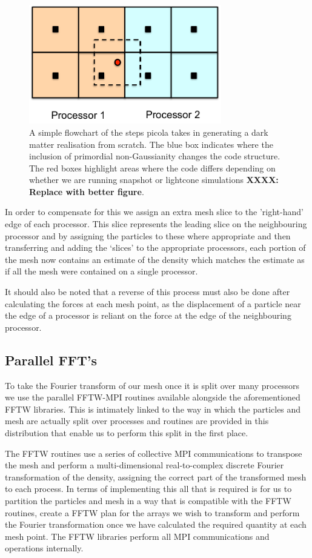 \documentclass[5p,authoryear]{elsarticle}
\begin{document}
\begin{figure}
\centering
\includegraphics[width=84mm]{cloudincell.pdf}
  \caption{A simple flowchart of the steps {\sc picola} takes in generating a dark matter realisation from scratch. The blue box indicates where the inclusion of primordial non-Gaussianity changes the code structure. The red boxes highlight areas where the code differs depending on whether we are running snapshot or lightcone simulations \textbf{XXXX: Replace with better figure}.}
  \label{cloudincell}
\end{figure}

In order to compensate for this we assign an extra mesh slice to the 'right-hand' edge of each processor. This slice represents the leading slice on the neighbouring processor and by assigning the particles to these where appropriate and then transferring and adding the `slices' to the appropriate processors, each portion of the mesh now contains an estimate of the density which matches the estimate as if all the mesh were contained on a single processor. 

It should also be noted that a reverse of this process must also be done after calculating the forces at each mesh point, as the displacement of a particle near the edge of a processor is reliant on the force at the edge of the neighbouring processor.

\subsection{Parallel FFT's}

To take the Fourier transform of our mesh once it is split over many processors we use the parallel FFTW-MPI routines available alongside the aforementioned FFTW libraries. This is intimately linked to the way in which the particles and mesh are actually split over processes and routines are provided in this distribution that enable us to perform this split in the first place. 

The FFTW routines use a series of collective MPI communications to transpose the mesh and perform a multi-dimensional real-to-complex discrete Fourier transformation of the density, assigning the correct part of the transformed mesh to each process. In terms of implementing this all that is required is for us to partition the particles and mesh in a way that is compatible with the FFTW routines, create a FFTW plan for the arrays we wish to transform and perform the Fourier transformation once we have calculated the required quantity at each mesh point. The FFTW libraries perform all MPI communications and operations internally.
\end{document}
